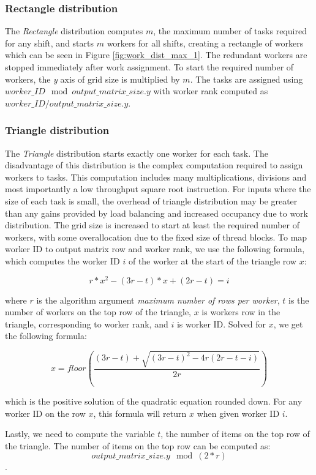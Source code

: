 \subsubsection{Rectangle distribution}

The \textit{Rectangle} distribution computes $m$, the maximum number of tasks required for any shift, and starts $m$ workers for all shifts, creating a rectangle of workers which can be seen in Figure \ref{fig:work_dist_max_1}. The redundant workers are stopped immediately after work assignment. To start the required number of workers, the \textit{y} axis of grid size is multiplied by $m$.
The tasks are assigned using $worker\_ID \mod output\_matrix\_size.y$ with worker rank computed as $worker\_ID / output\_matrix\_size.y$.

\subsubsection{Triangle distribution}
The \textit{Triangle} distribution starts exactly one worker for each task. The disadvantage of this distribution is the complex computation required to assign workers to tasks. This computation includes many multiplications, divisions and most importantly a low throughput square root instruction. For inputs where the size of each task is small, the overhead of triangle distribution may be greater than any gains provided by load balancing and increased occupancy due to work distribution. The grid size is increased to start at least the required number of workers, with some overallocation due to the fixed size of thread blocks. To map worker ID to output matrix row and worker rank, we use the following formula, which computes the worker ID $i$ of the worker at the start of the triangle row $x$:

\[
	r*x^2 - (3r - t)*x + (2r - t) = i
\]

where $r$ is the algorithm argument \textit{maximum number of rows per worker}, $t$ is the number of workers on the top row of the triangle, $x$ is workers row in the triangle, corresponding to worker rank, and $i$ is worker ID. Solved for $x$, we get the following formula:

\[
	x = floor(\frac{(3r - t) + \sqrt{(3r - t)^2 - 4r(2r - t - i)}}{2r})
\]

which is the positive solution of the quadratic equation rounded down. For any worker ID on the row $x$, this formula will return $x$ when given worker ID $i$.

Lastly, we need to compute the variable $t$, the number of items on the top row of the triangle. The number of items on the top row can be computed as:
\[
	output\_matrix\_size.y \mod (2*r)
\].


